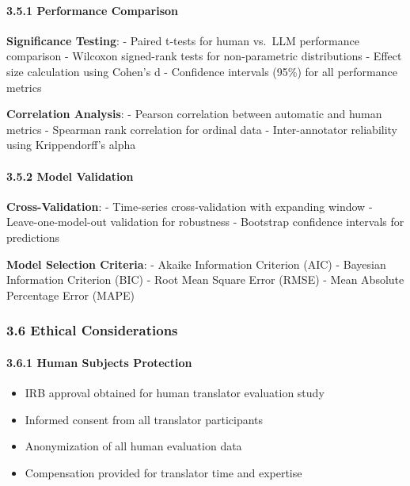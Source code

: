 \documentclass[12pt,a4paper]{article}
\providecommand{\tightlist}{%
  \setlength{\itemsep}{0pt}\setlength{\parskip}{0pt}}
\begin{document}
{{\hypertarget{performance-comparison}{%
\paragraph{3.5.1 Performance Comparison}\label{performance-comparison}}

\textbf{Significance Testing}: - Paired t-tests for human vs.~LLM
performance comparison - Wilcoxon signed-rank tests for non-parametric
distributions - Effect size calculation using Cohen's d - Confidence
intervals (95\%) for all performance metrics

\textbf{Correlation Analysis}: - Pearson correlation between automatic
and human metrics - Spearman rank correlation for ordinal data -
Inter-annotator reliability using Krippendorff's alpha

\hypertarget{model-validation}{%
\paragraph{3.5.2 Model Validation}\label{model-validation}}

\textbf{Cross-Validation}: - Time-series cross-validation with expanding
window - Leave-one-model-out validation for robustness - Bootstrap
confidence intervals for predictions

\textbf{Model Selection Criteria}: - Akaike Information Criterion (AIC)
- Bayesian Information Criterion (BIC) - Root Mean Square Error (RMSE) -
Mean Absolute Percentage Error (MAPE)

\hypertarget{ethical-considerations}{%
\subsubsection{3.6 Ethical
Considerations}\label{ethical-considerations}}

\hypertarget{human-subjects-protection}{%
\paragraph{3.6.1 Human Subjects
Protection}\label{human-subjects-protection}}

\begin{itemize}
\tightlist
\item
  IRB approval obtained for human translator evaluation study
\item
  Informed consent from all translator participants
\item
  Anonymization of all human evaluation data
\item
  Compensation provided for translator time and expertise
\end{itemize}

}}
\end{document}
